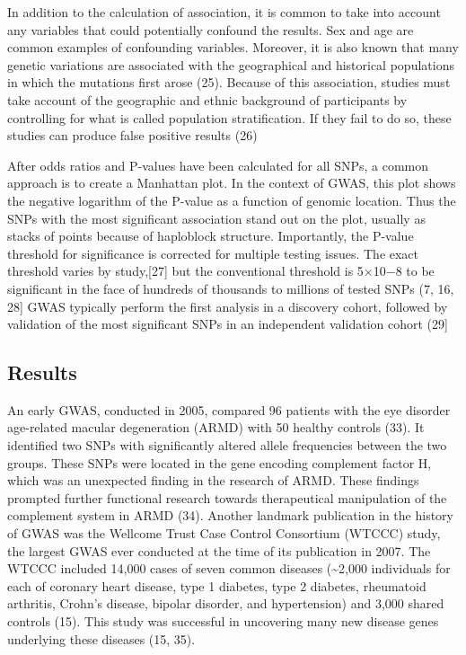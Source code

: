 \documentclass[
]{book}
\begin{document}
In addition to the calculation of association, it is common to take into account any variables that could potentially confound the results. Sex and age are common examples of confounding variables. Moreover, it is also known that many genetic variations are associated with the geographical and historical populations in which the mutations first arose (25). Because of this association, studies must take account of the geographic and ethnic background of participants by controlling for what is called population stratification. If they fail to do so, these studies can produce false positive results (26)

After odds ratios and P-values have been calculated for all SNPs, a common approach is to create a Manhattan plot. In the context of GWAS, this plot shows the negative logarithm of the P-value as a function of genomic location. Thus the SNPs with the most significant association stand out on the plot, usually as stacks of points because of haploblock structure. Importantly, the P-value threshold for significance is corrected for multiple testing issues. The exact threshold varies by study,{[}27{]} but the conventional threshold is 5×10−8 to be significant in the face of hundreds of thousands to millions of tested SNPs (7, 16, 28{]} GWAS typically perform the first analysis in a discovery cohort, followed by validation of the most significant SNPs in an independent validation cohort (29{]}

\hypertarget{results}{%
\subsection{Results}\label{results}}

An early GWAS, conducted in 2005, compared 96 patients with the eye disorder age-related macular degeneration (ARMD) with 50 healthy controls (33). It identified two SNPs with significantly altered allele frequencies between the two groups. These SNPs were located in the gene encoding complement factor H, which was an unexpected finding in the research of ARMD. These findings prompted further functional research towards therapeutical manipulation of the complement system in ARMD (34). Another landmark publication in the history of GWAS was the Wellcome Trust Case Control Consortium (WTCCC) study, the largest GWAS ever conducted at the time of its publication in 2007. The WTCCC included 14,000 cases of seven common diseases (\textasciitilde2,000 individuals for each of coronary heart disease, type 1 diabetes, type 2 diabetes, rheumatoid arthritis, Crohn's disease, bipolar disorder, and hypertension) and 3,000 shared controls (15). This study was successful in uncovering many new disease genes underlying these diseases (15, 35).
\end{document}
